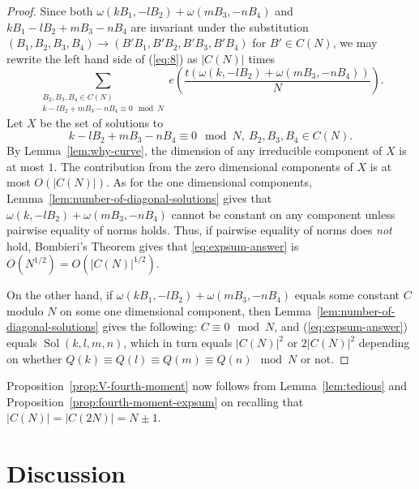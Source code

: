 \documentclass[12pt]{amsart}
\theoremstyle{plain}
\newcommand{\sol}{\operatorname{Sol}}
\newcommand{\curve}{X} %
\newcommand{\torus}{C(N)} %
\newcommand{\torusN}{C(2N)}%
\renewcommand{\^}{\widehat}
\begin{document}
\begin{proof}
Since both $\omega(kB_1,-l B_2)+\omega(mB_3,-n B_4)$ and $k B_1 - l
B_2 + m B_3 - n B_4$ are invariant under the substitution  
$
(B_1, B_2,B_3, B_4) \to (B' B_1, B' B_2 , B' B_3, B' B_4) 
$
for $B' \in \torus$,
we may rewrite the left hand side of (\ref{eq:8}) as $|\torus|$ times 
\begin{equation}
  \label{eq:expsum-answer}
\sum_{\substack{B_2, B_3, B_4 \in \torus \\
k-lB_2+mB_3-nB_4 \equiv 0 \mod N}}
e \left( \frac{t(\omega(k,-l B_2)+\omega(mB_3,-n B_4))  }{N} \right).
\end{equation}
%
Let $\curve$ be the set of solutions to 
$$
k-lB_2+mB_3-nB_4 \equiv 0 \mod N, \ B_2, B_3, B_4 \in \torus.
$$
%
By Lemma~\ref{lem:why-curve}, the dimension of any irreducible
component of $X$ is at most $1$.  The contribution
from the zero dimensional components of $\curve$ is at most
$O(|\torus|)$. 
%
As for the one dimensional components, 
Lemma~\ref{lem:number-of-diagonal-solutions} gives that $\omega(k,-l
B_2)+\omega(mB_3,-n B_4)$ cannot be constant on any  
component unless pairwise equality of norms holds.
%
Thus, %
if pairwise equality of norms does {\em not} hold, Bombieri's Theorem
gives that \eqref{eq:expsum-answer} is $O(N^{1/2}) =
O(|\torus|^{1/2})$. 

On the other hand, if
$\omega(kB_1,-l B_2)+\omega(mB_3,-n
B_4)$ equals some constant $C$ modulo $N$ on some one dimensional
component, then Lemma~\ref{lem:number-of-diagonal-solutions} 
gives the following:
$C \equiv 0 \mod N$, 
and (\ref{eq:expsum-answer}) equals $\sol(k,l,m,n)$, which in turn
equals $|\torus|^2$ or $2 |\torus|^2 $ depending on whether $Q(k) \equiv
Q(l) \equiv Q(m) \equiv Q(n) \mod N$ or not.
\end{proof}

Proposition~\ref{prop:V-fourth-moment} now follows from
 Lemma~\ref{lem:tedious} and 
Proposition~\ref{prop:fourth-moment-expsum} on recalling that 
$|\torus|= |\torusN|=N\pm1$.


\section{Discussion} 
\end{document}

